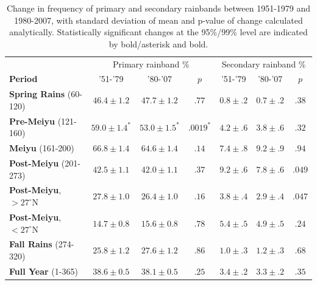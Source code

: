 \documentclass[final,grl]{agutexSI}
\begin{document}
\begin{table}

\centering

\caption{Change in frequency of primary and secondary rainbands between 1951-1979 and 1980-2007, with standard deviation of mean and p-value of change calculated analytically. Statistically significant changes at the 95\%/99\% level are indicated by bold/asterisk and bold.}

\begin{tabular}{ l c c c c c c}
	& \multicolumn{3}{c}{Primary rainband \%} & \multicolumn{3}{c}{Secondary rainband \%} \\
	\textbf{Period} & '51-'79 & '80-'07 & $p$ & '51-'79 & '80-'07 & $p$ \\
	\hline	
	\textbf{Spring Rains} (60-120)		& $46.4 \pm 1.2$ & $47.7 \pm 1.2$ & $ .77 $ 	& $0.8 \pm .2$ & $0.7 \pm .2$ & $.38$ \\
	\textbf{Pre-Meiyu} (121-160) 		& $\boldsymbol{59.0 \pm 1.4^*}$ & $\boldsymbol{53.0 \pm 1.5^*}$ & $ \boldsymbol{.0019^*} $ & $4.2 \pm .6$ & $3.8 \pm .6$ & $.32$ \\
	\textbf{Meiyu} (161-200)			& $66.8 \pm 1.4$ & $64.6 \pm 1.4$ & $ .14 $ 	& $7.4 \pm .8$ & $9.2 \pm .9$  & $.94$ \\
	\textbf{Post-Meiyu} (201-273)		& $42.5 \pm 1.1$ & $42.0 \pm 1.1$ & $ .37 $	& $9.2 \pm .6$ & $7.8 \pm .6$ & $.049$ \\
	\textbf{Post-Meiyu}, $>27^\circ$N 	& $27.8 \pm 1.0$ & $26.4 \pm 1.0$ & $ .16 $ 	& $3.8 \pm .4$ & $2.9 \pm .4$ & $.047$ \\
	\textbf{Post-Meiyu}, $<27^\circ$N 	& $14.7 \pm 0.8 $ & $15.6 \pm 0.8$ & $ .78 $ 	& $5.4 \pm .5$ & $4.9 \pm .5$ & $.24$  \\
	\textbf{Fall Rains} (274-320)			& $25.8 \pm 1.2 $ & $27.6 \pm 1.2$ & $ .86 $ 	& $1.0 \pm .3$ & $1.2 \pm .3$ & $.68$ \\
	\textbf{Full Year} (1-365)			& $38.6 \pm 0.5 $ & $38.1 \pm 0.5$ & $ .25 $ 	& $3.4 \pm .2$ & $3.3 \pm .2$ & $.35$ \\

\end{tabular}
\label{ts5}
\end{table}
\end{document}
